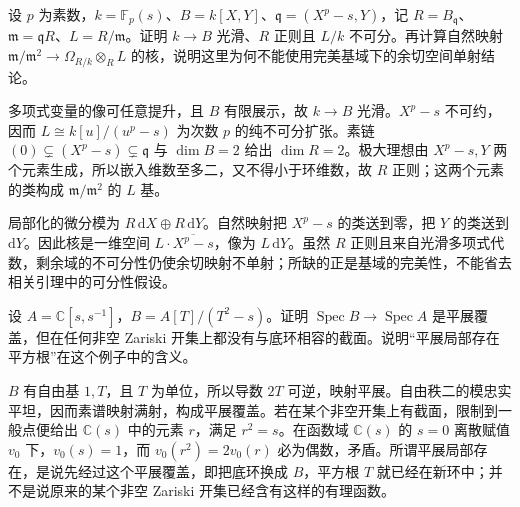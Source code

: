 \begin{optionalexercise}\label{b3:ex:23-inseparable-closed-point}
	设 \(p\) 为素数，\(k=\mathbb F_p(s)\)、\(B=k[X,Y]\)、\(\mathfrak q=(X^p-s,Y)\)，记 \(R=B_{\mathfrak q}\)、\(\mathfrak m=\mathfrak qR\)、\(L=R/\mathfrak m\)。证明 \(k\to B\) 光滑、\(R\) 正则且 \(L/k\) 不可分。再计算自然映射 \(\mathfrak m/\mathfrak m^2\to\Omega_{R/k}\otimes_RL\) 的核，说明这里为何不能使用完美基域下的余切空间单射结论。
\end{optionalexercise}
\begin{solution}
	多项式变量的像可任意提升，且 \(B\) 有限展示，故 \(k\to B\) 光滑。\(X^p-s\) 不可约，因而 \(L\cong k[u]/(u^p-s)\) 为次数 \(p\) 的纯不可分扩张。素链 \((0)\subsetneq(X^p-s)\subsetneq\mathfrak q\) 与 \(\dim B=2\) 给出 \(\dim R=2\)。极大理想由 \(X^p-s,Y\) 两个元素生成，所以嵌入维数至多二，又不得小于环维数，故 \(R\) 正则；这两个元素的类构成 \(\mathfrak m/\mathfrak m^2\) 的 \(L\) 基。

	局部化的微分模为 \(R\,\mathrm{d}X\oplus R\,\mathrm{d}Y\)。自然映射把 \(X^p-s\) 的类送到零，把 \(Y\) 的类送到 \(\mathrm{d}Y\)。因此核是一维空间 \(L\cdot\overline{X^p-s}\)，像为 \(L\,\mathrm{d}Y\)。虽然 \(R\) 正则且来自光滑多项式代数，剩余域的不可分性仍使余切映射不单射；所缺的正是基域的完美性，不能省去相关引理中的可分性假设。
\end{solution}

\begin{optionalexercise}\label{b3:ex:23-square-root-cover}
	设 \(A=\mathbb C[s,s^{-1}]\)，\(B=A[T]/(T^2-s)\)。证明 \(\operatorname{Spec}B\to\operatorname{Spec}A\) 是平展覆盖，但在任何非空 Zariski 开集上都没有与底环相容的截面。说明“平展局部存在平方根”在这个例子中的含义。
\end{optionalexercise}
\begin{solution}
	\(B\) 有自由基 \(1,T\)，且 \(T\) 为单位，所以导数 \(2T\) 可逆，映射平展。自由秩二的模忠实平坦，因而素谱映射满射，构成平展覆盖。若在某个非空开集上有截面，限制到一般点便给出 \(\mathbb C(s)\) 中的元素 \(r\)，满足 \(r^2=s\)。在函数域 \(\mathbb C(s)\) 的 \(s=0\) 离散赋值 \(v_0\) 下，\(v_0(s)=1\)，而 \(v_0(r^2)=2v_0(r)\) 必为偶数，矛盾。所谓平展局部存在，是说先经过这个平展覆盖，即把底环换成 \(B\)，平方根 \(T\) 就已经在新环中；并不是说原来的某个非空 Zariski 开集已经含有这样的有理函数。
\end{solution}
